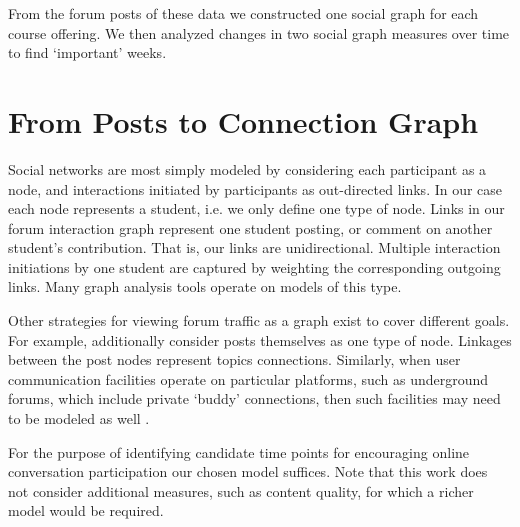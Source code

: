 From the forum posts of these data we constructed one social graph for
each course offering. We then analyzed changes in two social graph
measures over time to find `important' weeks.

\section{From Posts to Connection Graph}

Social networks are most simply modeled by considering each
participant as a node, and interactions initiated by participants as
out-directed links. In our case each node represents a student,
i.e. we only define one type of node. Links in our forum interaction
graph represent one student posting, or comment on another student's
contribution. That is, our links are unidirectional. Multiple
interaction initiations by one student are captured by weighting the
corresponding outgoing links. Many graph analysis tools operate on
models of this type.

Other strategies for viewing forum traffic as a graph exist to cover
different goals. For example, \cite{Anwar2013} additionally consider
posts themselves as one type of node. Linkages between the post nodes
represent topics connections. Similarly, when user communication
facilities operate on particular platforms, such as underground
forums, which include private `buddy' connections, then such
facilities may need to be modeled as well \cite{Moto2011}.

For the purpose of identifying candidate time points for encouraging
online conversation participation our chosen model suffices. Note that
this work does not consider additional measures, such as content
quality, for which a richer model would be required.

